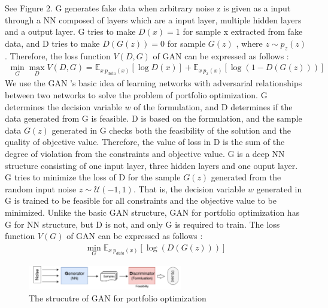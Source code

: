 \documentclass[11pt]{article}
\begin{document}
\begin{itemize}
See Figure 2. G generates fake data when arbitrary noise z is given as a input through a NN composed of layers which are a input layer, multiple hidden layers and a output layer. G tries to make $D(x) = 1$ for sample x extracted from fake data, and D tries to make $D(G (z)) = 0$ for sample $G (z)$ , where $z \sim p_{z}(z)$. Therefore, the loss function $V(D,G)$ of GAN can be expressed as follows : %
 \begin{align*}
 \min_G \max_D V(D,G)  = \mathbb{E}_{x~p_{data}(x)}[\log D(x)]  + \mathbb{E}_{x~p_{x}(x)}[\log(1-D(G(z)))] 
 \end{align*}
 We use the GAN 's basic idea of learning networks with adversarial relationships between two networks to solve the problem of portfolio optimization. G determines the decision variable $w$ of the formulation, and D determines if the data generated from G is feasible. D is based on the formulation, and the sample data $G(z)$ generated in G checks both the feasibility of the solution and the quality of objective value. Therefore, the value of loss in D is the sum of the degree of violation from the constraints and objective value. G is a deep NN structure consisting of one input layer, three hidden layers and one ouput layer. G tries to minimize the loss of D for the sample $G(z)$ generated from the random input noise $z \sim \mathcal {U}(-1,1)$. That is, the decision variable $ w $ generated in G is trained to be feasible for all constraints and the objective value to be minimized. Unlike the basic GAN structure, GAN for portfolio optimization has G for NN structure, but D is not, and only G is required to train. The loss function $V(G)$ of GAN can be expressed as follows :
 \begin{align*}
 \min_G \mathbb{E}_{x~p_{data}(x)}[\log(D(G(z)))] 
 \end{align*}

\begin{figure}[h] 
	\begin{center}
		\includegraphics[width=0.6\textwidth]{GAN_port}
		\caption{The strucutre of GAN for portfolio optimization} \label{fig:GAN-port}
	\end{center}

\end{figure}
	

\end{itemize}
\end{document}
